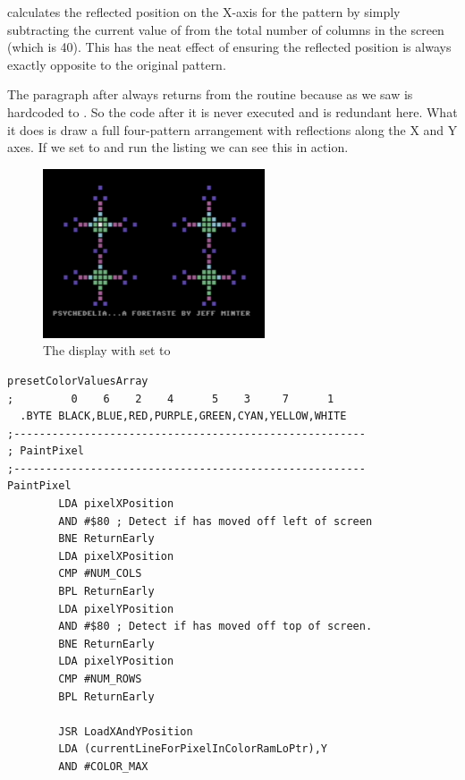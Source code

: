 { calculates the reflected position on the X-axis for the pattern by simply subtracting the current value
of  from the total number of columns in the screen (which is 40). This has the neat effect of ensuring
the reflected position is always exactly opposite to the original pattern.

The paragraph after  always returns from the routine because as we saw  is
hardcoded to . So the code after it is never executed and is redundant here. What it does is draw a full four-pattern
arrangement with reflections along the X and Y axes. If we set  to  and run the
listing we can see this in action.


\begin{figure}[H]
    \centering
      \includegraphics[height=5cm]{src/listing_commentary/four_pattern.png}
  \caption*{The display with  set to }
\end{figure}


\clearpage
\begin{lstlisting}[caption=Where the painting is actually done.]
presetColorValuesArray
;         0    6    2    4      5    3     7      1
  .BYTE BLACK,BLUE,RED,PURPLE,GREEN,CYAN,YELLOW,WHITE
;-------------------------------------------------------
; PaintPixel
;-------------------------------------------------------
PaintPixel   
        LDA pixelXPosition
        AND #$80 ; Detect if has moved off left of screen
        BNE ReturnEarly
        LDA pixelXPosition
        CMP #NUM_COLS
        BPL ReturnEarly
        LDA pixelYPosition
        AND #$80 ; Detect if has moved off top of screen.
        BNE ReturnEarly
        LDA pixelYPosition
        CMP #NUM_ROWS
        BPL ReturnEarly

        JSR LoadXAndYPosition
        LDA (currentLineForPixelInColorRamLoPtr),Y
        AND #COLOR_MAX


\end{lstlisting}}
